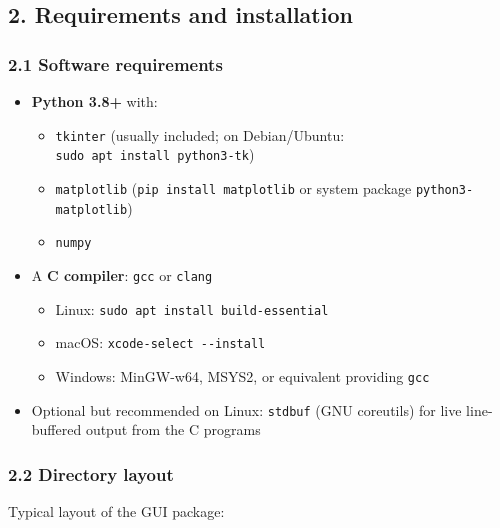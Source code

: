 \hypertarget{requirements-and-installation}{%
\subsection{2. Requirements and
installation}\label{requirements-and-installation}}

\hypertarget{software-requirements}{%
\subsubsection{2.1 Software requirements}\label{software-requirements}}

\begin{itemize}
\tightlist
\item
  \textbf{Python 3.8+} with:

  \begin{itemize}
  \tightlist
  \item
    \texttt{tkinter} (usually included; on Debian/Ubuntu:
    \texttt{sudo\ apt\ install\ python3-tk})
  \item
    \texttt{matplotlib} (\texttt{pip\ install\ matplotlib} or system
    package \texttt{python3-matplotlib})
  \item
    \texttt{numpy}
  \end{itemize}
\item
  A \textbf{C compiler}: \texttt{gcc} or \texttt{clang}

  \begin{itemize}
  \tightlist
  \item
    Linux: \texttt{sudo\ apt\ install\ build-essential}\\
  \item
    macOS: \texttt{xcode-select\ -\/-install}\\
  \item
    Windows: MinGW-w64, MSYS2, or equivalent providing \texttt{gcc}
  \end{itemize}
\item
  Optional but recommended on Linux: \texttt{stdbuf} (GNU coreutils) for
  live line-buffered output from the C programs
\end{itemize}

\hypertarget{directory-layout}{%
\subsubsection{2.2 Directory layout}\label{directory-layout}}

Typical layout of the GUI package:

